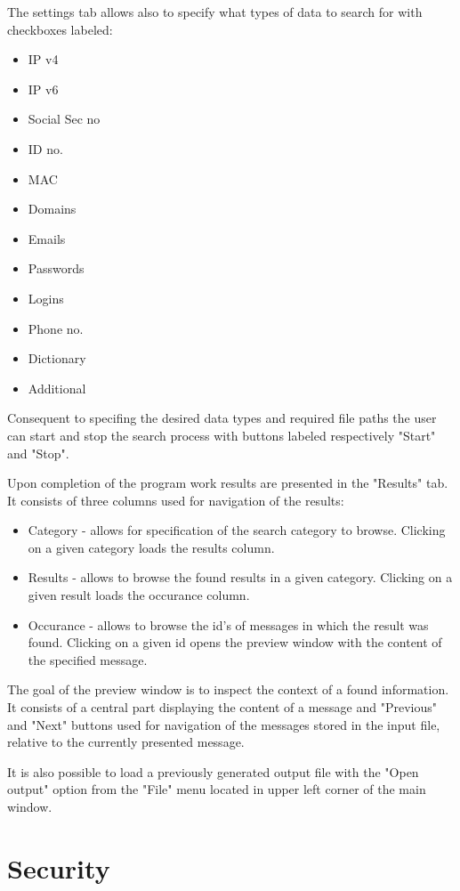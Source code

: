 \documentclass[a4paper,twoside,12pt]{book}
\begin{document}
The settings tab allows also to specify what types of data to search for with checkboxes labeled:

\begin{itemize}
   \item IP v4
   \item IP v6
   \item Social Sec no
   \item ID no.
   \item MAC
   \item Domains
   \item Emails
   \item Passwords
   \item Logins
   \item Phone no.
   \item Dictionary
   \item Additional
\end{itemize}

Consequent to specifing the desired data types and required file paths the user can start and stop the search process
with buttons labeled respectively "Start" and "Stop".

Upon completion of the program work results are presented in the "Results" tab. It consists of three columns used for
navigation of the results: 
\begin{itemize}
   \item Category - allows for specification of the search category to browse. Clicking on a given category loads
   the results column.
   \item Results - allows to browse the found results in a given category. Clicking on a given result loads the 
   occurance column.
   \item Occurance - allows to browse the id's of messages in which the result was found. Clicking on a given id
   opens the preview window with the content of the specified message.
\end{itemize}

The goal of the preview window is to inspect the context of a found information. It consists of a central part 
displaying the content of a message and "Previous" and "Next" buttons used for navigation of the messages stored
in the input file, relative to the currently presented message.

It is also possible to load a previously generated output file with the "Open output" option from the
"File" menu located in upper left corner of the main window.

\section{Security}
\end{document}
